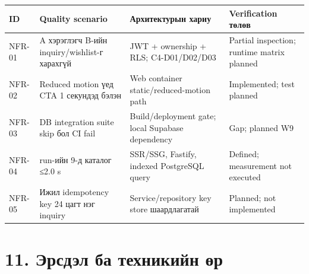 \documentclass[
  mongolian,
]{article}
\begin{document}
\begin{longtable}[]{@{}
  >{\raggedright\arraybackslash}p{}
  >{\raggedright\arraybackslash}p{}
  >{\raggedright\arraybackslash}p{}
  >{\raggedright\arraybackslash}p{}@{}}
\toprule\noalign{}
\begin{minipage}[b]{\linewidth}\raggedright
ID
\end{minipage} & \begin{minipage}[b]{\linewidth}\raggedright
Quality scenario
\end{minipage} & \begin{minipage}[b]{\linewidth}\raggedright
Архитектурын хариу
\end{minipage} & \begin{minipage}[b]{\linewidth}\raggedright
Verification төлөв
\end{minipage} \\
\midrule\noalign{}
\endhead
\bottomrule\noalign{}
\endlastfoot
NFR-01 & A хэрэглэгч B-ийн inquiry/wishlist-г харахгүй & JWT + ownership
+ RLS; C4-D01/D02/D03 & Partial inspection; runtime matrix planned \\
NFR-02 & Reduced motion үед CTA 1 секундэд бэлэн & Web container
static/reduced-motion path & Implemented; test planned \\
NFR-03 & DB integration suite skip бол CI fail & Build/deployment gate;
local Supabase dependency & Gap; planned W9 \\
NFR-04 & 10 run-ийн 9-д каталог ≤2.0 s & SSR/SSG, Fastify, indexed
PostgreSQL query & Defined; measurement not executed \\
NFR-05 & Ижил idempotency key 24 цагт нэг inquiry & Service/repository
key store шаардлагатай & Planned; not implemented \\
\end{longtable}

\section{11. Эрсдэл ба техникийн
өр}\label{ux44dux440ux441ux434ux44dux43b-ux431ux430-ux442ux435ux445ux43dux438ux43aux438ux439ux43d-ux4e9ux440}
\end{document}
